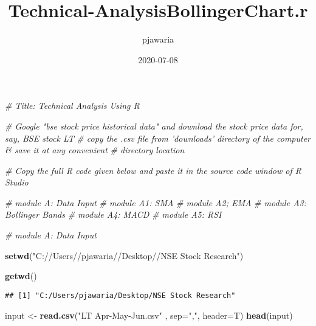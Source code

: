 \documentclass[
]{article}
\title{Technical-AnalysisBollingerChart.r}
\author{pjawaria}
\date{2020-07-08}
\newenvironment{Shaded}{\begin{snugshade}}{\end{snugshade}}
\newcommand{\CommentTok}[1]{\textcolor[rgb]{0.56,0.35,0.01}{\textit{#1}}}
\newcommand{\DataTypeTok}[1]{\textcolor[rgb]{0.13,0.29,0.53}{#1}}
\newcommand{\KeywordTok}[1]{\textcolor[rgb]{0.13,0.29,0.53}{\textbf{#1}}}
\newcommand{\NormalTok}[1]{#1}
\newcommand{\StringTok}[1]{\textcolor[rgb]{0.31,0.60,0.02}{#1}}
\begin{document}
\maketitle

\begin{Shaded}
\begin{Highlighting}[]
\CommentTok{# Title: Technical Analysis Using R}

\CommentTok{# Google "bse stock price historical data" and download the stock price data for, say, BSE stock LT}
\CommentTok{# copy the .csv file from 'downloads' directory of the computer & save it at any convenient }
\CommentTok{# directory location}

\CommentTok{# Copy the full R code given below and paste it in the source code window of R Studio}

\CommentTok{# module A: Data Input }
\CommentTok{# module A1: SMA}
\CommentTok{# module A2; EMA}
\CommentTok{# module A3: Bollinger Bands}
\CommentTok{# module A4: MACD}
\CommentTok{# module A5: RSI}
\end{Highlighting}
\end{Shaded}

\begin{Shaded}
\begin{Highlighting}[]
\CommentTok{# module A: Data Input}

\KeywordTok{setwd}\NormalTok{(}\StringTok{"C://Users//pjawaria//Desktop//NSE Stock Research"}\NormalTok{)}

\KeywordTok{getwd}\NormalTok{()}
\end{Highlighting}
\end{Shaded}

\begin{verbatim}
## [1] "C:/Users/pjawaria/Desktop/NSE Stock Research"
\end{verbatim}

\begin{Shaded}
\begin{Highlighting}[]
\NormalTok{input <-}\StringTok{ }\KeywordTok{read.csv}\NormalTok{(}\StringTok{"LT Apr-May-Jun.csv"}\NormalTok{ , }\DataTypeTok{sep=}\StringTok{","}\NormalTok{, }\DataTypeTok{header=}\NormalTok{T)}
\KeywordTok{head}\NormalTok{(input)}
\end{Highlighting}
\end{Shaded}
\end{document}
